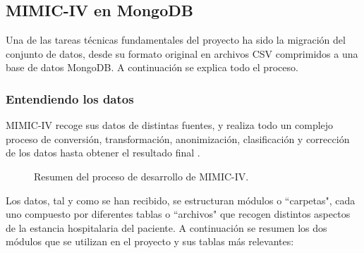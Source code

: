 \subsection{MIMIC-IV en MongoDB}


Una de las tareas técnicas fundamentales del proyecto ha sido la migración del conjunto de datos, desde su formato original en archivos CSV comprimidos a una base de datos MongoDB. A continuación se explica todo el proceso.

\subsubsection{Entendiendo los datos}

MIMIC-IV recoge sus datos de distintas fuentes, y realiza todo un complejo proceso de conversión, transformación, anonimización, clasificación y corrección de los datos hasta obtener el resultado final \cite{MIMICIV_paper}.

\begin{figure}[H]
    \centering
    \caption{Resumen del proceso de desarrollo de MIMIC-IV.}
    \label{fig:desarrollo_mimiciv}
\end{figure}


Los datos, tal y como se han recibido, se estructuran módulos o ``carpetas", cada uno compuesto por diferentes tablas o ``archivos" que recogen distintos aspectos de la estancia hospitalaria del paciente. A continuación se resumen los dos módulos que se utilizan en el proyecto y sus tablas más relevantes:

